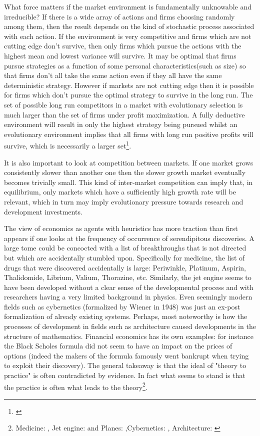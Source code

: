 What force matters if the market environment is fundamentally unknowable and irreducible? If there is a wide array of actions and firms choosing randomly among them, then the result depends on the kind of stochastic process associated with each action. If the environment is very competitive and firms which are not cutting edge don't survive, then only firms which pursue the actions with the highest mean and lowest variance will survive. It may be optimal that firms pursue strategies as a function of some personal characteristics(such as size) so that firms don't all take the same action even if they all have the same deterministic strategy. However if markets are not cutting edge then it is possible for firms which don't pursue the optimal strategy to survive in the long run. The set of possible long run competitors in a market with evolutionary selection is much larger than the set of firms under profit maximization. A fully deductive environment will result in only the highest strategy being pursued whilst an evolutionary environment implies that all firms with long run positive profits will survive, which is necessarily a larger set\footnote{\citep{alchian1950uncertainty}}. 

It is also important to look at competition between markets. If one market grows consistently slower than another one then the slower growth market eventually becomes trivially small. This kind of inter-market competition can imply that, in equilibrium, only markets which have a sufficiently high growth rate will be relevant, which in turn may imply evolutionary pressure towards research and development investments. 

The view of economics as agents with heuristics has more traction than first appears if one looks at the frequency of occurrence of serendipitous discoveries. A large tome could be concocted with a list of breakthroughs that is not directed but which are accidentally stumbled upon. Specifically for medicine, the list of drugs that were discovered accidentally is large: Periwinkle, Platinum, Aspirin, Thalidomide, Librium, Valium, Thorazine, etc. Similarly, the jet engine seems to have been developed without a clear sense of the developmental process and with researchers having a very limited background in physics. Even seemingly modern fields such as cybernetics (formalized by Wiener in 1948) was just an ex-post formalization of already existing systems. Perhaps, most noteworthy is how the processes of development in fields such as architecture caused developments in the structure of mathematics. Financial economics has its own examples: for instance the Black Scholes formula did not seem to have an impact on the prices of options (indeed the makers of the formula famously went bankrupt when trying to exploit their discovery). The general takeaway is that the ideal of "theory to practice" is often contradicted by evidence. In fact what seems to stand is that the practice is often what leads to the theory\footnote{ Medicine: \cite{meyers2007happy}, Jet engine: \cite{scranton2006urgency} and Planes: \cite{meyer2013airplane},Cybernetics: \cite{mindell2002between}, Architecture: \cite{unguru1992guy}}.

